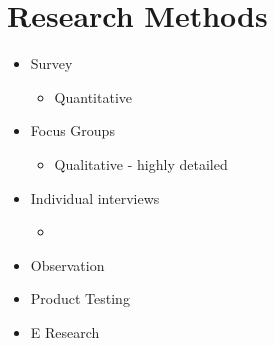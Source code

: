 \documentclass{article}[18pt]
\begin{document}
\section{Research Methods}
\begin{itemize}
	\item Survey
	\begin{itemize}
		\item Quantitative
	\end{itemize}
	\item Focus Groups
	\begin{itemize}
		\item Qualitative - highly detailed 
	\end{itemize}	
	
	\item Individual interviews
	\begin{itemize}
		\item 
	\end{itemize}
	
	
	
	\item Observation
	\item Product Testing
	\item E Research
\end{itemize}
\end{document}
